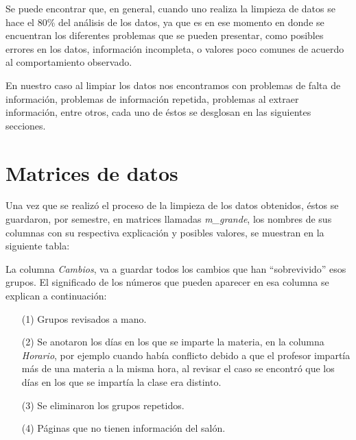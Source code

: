 Se puede encontrar que, en general, cuando uno realiza la limpieza de datos se hace el 80\% del análisis de los datos, ya que es en ese momento en donde se encuentran los diferentes problemas que se pueden presentar, como posibles errores en los datos, información incompleta, o valores poco comunes de acuerdo al comportamiento observado.

En nuestro caso al limpiar los datos nos encontramos con problemas de falta de información, problemas de información repetida, problemas al extraer información, entre otros, cada uno de éstos se desglosan en las siguientes secciones.


\section{Matrices de datos}

Una vez que se realizó el proceso de la limpieza de los datos obtenidos, éstos se guardaron, por semestre, en matrices llamadas \textit{m\_grande}, los nombres de sus columnas con su respectiva explicación y posibles valores, se muestran en la siguiente tabla:

\dfNmatrizGrande %

La columna \textit{Cambios}, va a guardar todos los cambios que han ``sobrevivido'' esos grupos. El significado de los números que pueden aparecer en esa columna se explican a continuación:

\begin{enumerate}
\item[(1)] Grupos revisados a mano.

\item[(2)] Se anotaron los días en los que se imparte la materia, en la columna \textit{Horario}, por ejemplo cuando había conflicto debido a que el profesor impartía más de una materia a la misma hora, al revisar el caso se encontró que los días en los que se impartía la clase era distinto.

\item[(3)] Se eliminaron los grupos repetidos.

\item[(4)] Páginas que no tienen información del salón.
\end{enumerate}
